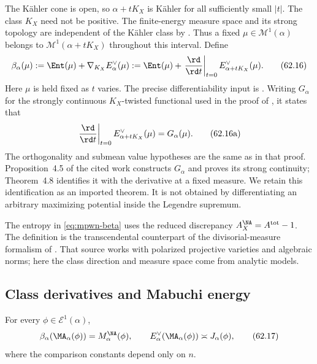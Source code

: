 The K\"ahler cone is open, so $\alpha+tK_X$ is K\"ahler for all
sufficiently small $|t|$.  The class $K_X$ need not be positive.
The finite-energy measure space and its strong topology are independent
of the K\"ahler class by \cite[Theorem~3.1, pp.~187--188]{BJ25FiniteEnergy}.
Thus a fixed $\mu\in\mathcal M^1(\alpha)$ belongs to
$\mathcal M^1(\alpha+tK_X)$ throughout this interval.  Define
\[
 \beta_\alpha(\mu)
 :=\Ent(\mu)+\nabla_{K_X}E_\alpha^\vee(\mu)
 :=\Ent(\mu)+
    \left.\frac{\rd}{\rd t}\right|_{t=0}
       E_{\alpha+tK_X}^\vee(\mu).
\tag{62.16}\label{eq:mpwn-beta}
\]
Here $\mu$ is held fixed as $t$ varies.  The precise differentiability
input is \cite[Theorem~4.8, pp.~195--197]{BJ25FiniteEnergy}.
Writing $G_\alpha$ for the strongly continuous $K_X$-twisted
functional used in the proof of
, it states that
\[
 \left.\frac{\rd}{\rd t}\right|_{t=0}
       E_{\alpha+tK_X}^\vee(\mu)=G_\alpha(\mu).
\tag{62.16a}\label{eq:mpwn-fixed-measure-class-derivative}
\]
The orthogonality and submean value hypotheses are the same as in
that proof.  Proposition~4.5 of the cited work constructs
$G_\alpha$ and proves its strong continuity; Theorem~4.8 identifies
it with the derivative at a fixed measure.  We retain this
identification as an imported theorem.  It is not obtained by
differentiating an arbitrary maximizing potential inside the
Legendre supremum.

The entropy in \eqref{eq:mpwn-beta} uses the reduced discrepancy
$A_X^{\NA}=A^{\mathrm{tot}}-1$.
The definition is the transcendental counterpart of the
divisorial-measure formalism of \cite[Introduction, pp.~3--5]{BJKS2}.  That source works
with polarized projective varieties and algebraic norms; here the
class direction and measure space come from analytic models.

\subsection{Class derivatives and Mabuchi energy}
\label{subsec:mpwn-k-class-derivatives}

\begin{theorem}\label{thm:mpwn-beta-mabuchi}
For every $\phi\in\mathcal E^1(\alpha)$,
\[
 \beta_\alpha(\MA_\alpha(\phi))
      =M_\alpha^{\NA}(\phi),
\qquad
 E_\alpha^\vee(\MA_\alpha(\phi))
      \asymp J_\alpha(\phi),
\tag{62.17}\label{eq:mpwn-beta-mabuchi}
\]
where the comparison constants depend only on $n$.
\end{theorem}

